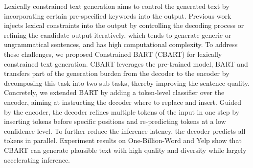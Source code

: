 Lexically constrained text generation aims to control the generated text by incorporating certain pre-specified keywords into the output. Previous work injects lexical constraints into the output by controlling the decoding process or refining the candidate output iteratively, which tends to generate generic or ungrammatical sentences, and has high computational complexity. To address these challenges, we proposed Constrained BART (CBART) for lexically constrained text generation. CBART leverages the pre-trained model, BART and transfers part of the generation burden from the decoder to the encoder by decomposing this task into two sub-tasks, thereby improving the sentence quality. Concretely, we extended BART by adding a token-level classifier over the encoder, aiming at instructing the decoder where to replace and insert. Guided by the encoder, the decoder refines multiple tokens of the input in one step by inserting tokens before specific positions and re-predicting tokens at a low confidence level. To further reduce the inference latency, the decoder predicts all tokens in parallel. Experiment results on One-Billion-Word and Yelp show that CBART can generate plausible text with high quality and diversity while largely accelerating inference.
